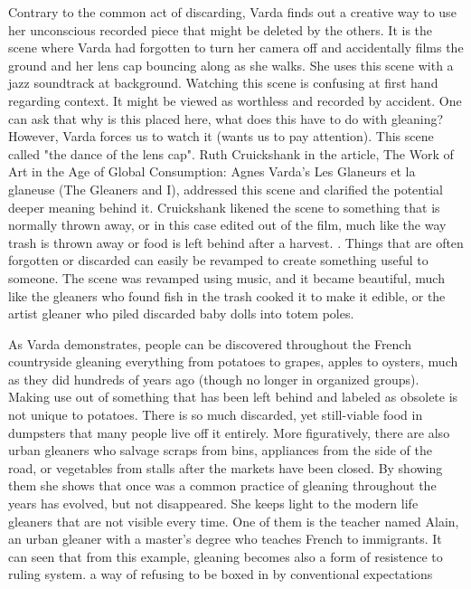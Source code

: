 Contrary to the common act of discarding, Varda finds out a creative way to use her unconscious recorded piece that might be deleted by the others. It is the scene where Varda had forgotten to turn her camera off and accidentally films the ground and her lens cap bouncing along as she walks. She uses this scene with a jazz soundtrack at background. Watching this scene is confusing at first hand regarding context. It might be viewed as worthless and recorded by accident. One can ask that why is this placed here, what does this have to do with gleaning? However, Varda forces us to watch it (wants us to pay attention). This scene called "the dance of the lens cap". Ruth Cruickshank in the article, The Work of Art in the Age of Global Consumption: Agnes Varda’s Les Glaneurs et la glaneuse (The Gleaners and I), addressed this scene and clarified the potential deeper meaning behind it. Cruickshank likened the scene to something that is normally thrown away, or in this case edited out of the film, much like the way trash is thrown away or food is left behind after a harvest.  \cite{cruickshank2007work}. Things that are often forgotten or discarded can easily be revamped to create something useful to someone. The scene was revamped using music, and it became beautiful, much like the gleaners who found fish in the trash cooked it to make it edible, or the artist gleaner who piled discarded baby dolls into totem poles.


As Varda demonstrates, people can be discovered throughout the French countryside gleaning everything from potatoes to grapes, apples to oysters, much as they did hundreds of years ago (though no longer in organized groups). Making use out of something that has been left behind and labeled as obsolete is not unique to potatoes. There is so much discarded, yet still-viable food in dumpsters that many people live off it entirely. More figuratively, there are also urban gleaners who salvage scraps from bins, appliances from the side of the road, or vegetables from stalls after the markets have been closed. By showing them she shows that once was a common practice of gleaning throughout the years has evolved, but not disappeared. She keeps light to the modern life gleaners that are not visible every time. One of them is the teacher named Alain, an urban gleaner with a master's degree who teaches French to immigrants. It can seen that from this example, gleaning becomes also a form of resistence to ruling system. a way of refusing to be boxed in by conventional expectations

